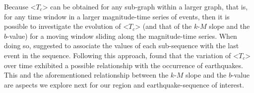 Because <$T_c$> can be obtained for any sub-graph within a larger graph, that is, for any time window in a larger magnitude-time series of events, then it is possible to investigate the evolution of <$T_c$> (and that of the $k$-$M$ slope and the $b$-value) for a moving window sliding along the magnitude-time series. When doing so, \citet{Telesca2016} suggested to associate the values of each sub-sequence with the last event in the sequence. Following this approach, \citet{Telesca2016} found that the variation of <$T_c$> over time exhibited a possible relationship with the occurrence of earthquakes. This and the aforementioned relationship between the $k$-$M$ slope and the $b$-value are aspects we explore next for our region and earthquake-sequence of interest.


